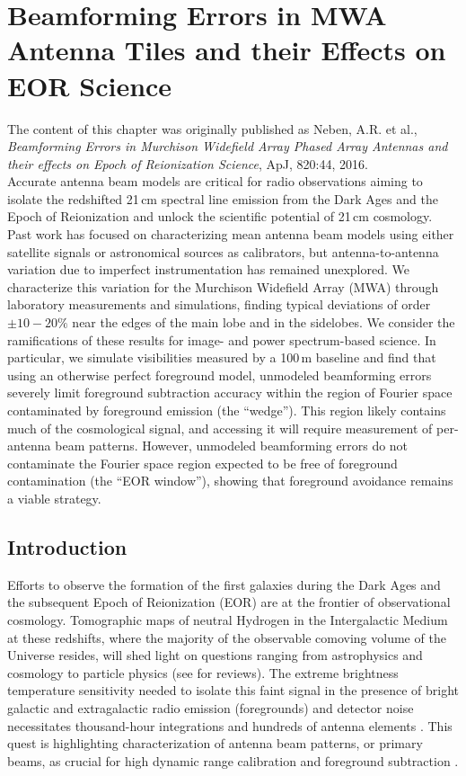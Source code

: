 \chapter{Beamforming Errors in MWA Antenna Tiles and their Effects on EOR Science}

The content of this chapter was originally published as Neben, A.R. et al., \textit{Beamforming Errors in Murchison Widefield Array Phased Array Antennas and their effects on Epoch of Reionization Science}, ApJ, 820:44, 2016.\\

Accurate antenna beam models are critical for radio observations aiming to isolate the redshifted 21\,cm spectral line emission from the Dark Ages and the Epoch of Reionization and unlock the scientific potential of 21\,cm cosmology. Past work has focused on characterizing mean antenna beam models using either satellite signals or astronomical sources as calibrators, but antenna-to-antenna variation due to imperfect instrumentation has remained unexplored. We characterize this variation for the Murchison Widefield Array (MWA) through laboratory measurements and simulations, finding typical deviations of order $\pm10-20\%$ near the edges of the main lobe and in the sidelobes. We consider the ramifications of these results for image- and power spectrum-based science. In particular, we simulate visibilities measured by a 100\,m baseline and find that using an otherwise perfect foreground model, unmodeled beamforming errors severely limit foreground subtraction accuracy within the region of Fourier space contaminated by foreground emission (the ``wedge''). This region likely contains much of the cosmological signal, and accessing it will require measurement of per-antenna beam patterns. However, unmodeled beamforming errors do not contaminate the Fourier space region expected to be free of foreground contamination (the ``EOR window''), showing that foreground avoidance remains a viable strategy. 

\section{Introduction}

Efforts to observe the formation of the first galaxies during the Dark Ages and the subsequent Epoch of Reionization (EOR) are at the frontier of observational cosmology. Tomographic maps of neutral Hydrogen in the Intergalactic Medium at these redshifts, where the majority of the observable comoving volume of the Universe resides, will shed light on questions ranging from astrophysics and cosmology to particle physics (see \citet{FurlanettoReview, miguelreview, PritchardLoebReview, aviBook, zaroubi} for reviews). The extreme brightness temperature sensitivity needed to isolate this faint signal in the presence of bright galactic and extragalactic radio emission (foregrounds) and detector noise necessitates thousand-hour integrations and hundreds of antenna elements \citep[e.g.][]{parsons12b, beardsley13, nithya13, PoberNextGen}. This quest is highlighting characterization of antenna beam patterns, or primary beams, as crucial for high dynamic range calibration and foreground subtraction \citep{moore13, jacobs2013,nithya15,pober16}.

